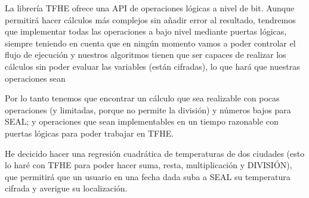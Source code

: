 La librería TFHE ofrece una API de operaciones lógicas a nivel de bit. Aunque permitirá hacer cálculos más complejos sin añadir error al resultado, tendremos que implementar todas las operaciones a bajo nivel mediante puertas lógicas, siempre teniendo en cuenta que en ningún momento vamos a poder controlar el flujo de ejecución y nuestros algoritmos tienen que ser capaces de realizar los cálculos sin poder evaluar las variables (están cifradas), lo que hará que nuestras operaciones sean 

Por lo tanto tenemos que encontrar un cálculo que sea realizable con pocas operaciones (y limitadas, porque no permite la división) y números bajos para SEAL; y operaciones que sean implementables en un tiempo razonable con puertas lógicas para poder trabajar en TFHE. 

He decicido hacer una regresión cuadrática de temperaturas de dos ciudades (esto lo haré con TFHE para poder hacer suma, resta, multiplicación y DIVISIÓN), que permitirá que un usuario en una fecha dada suba a SEAL su temperatura cifrada y averigue su localización.

